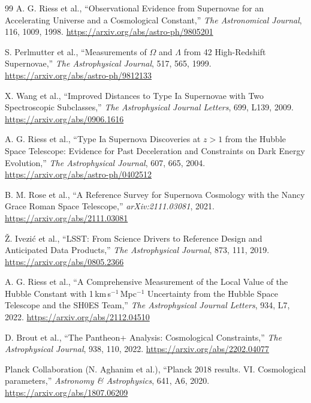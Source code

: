 \begin{thebibliography}{99}
A. G. Riess et al.,
``Observational Evidence from Supernovae for an Accelerating Universe and a Cosmological Constant,''
\emph{The Astronomical Journal}, 116, 1009, 1998.
\url{https://arxiv.org/abs/astro-ph/9805201}

S. Perlmutter et al.,
``Measurements of $\Omega$ and $\Lambda$ from 42 High-Redshift Supernovae,''
\emph{The Astrophysical Journal}, 517, 565, 1999.
\url{https://arxiv.org/abs/astro-ph/9812133}

X. Wang et al.,
``Improved Distances to Type Ia Supernovae with Two Spectroscopic Subclasses,''
\emph{The Astrophysical Journal Letters}, 699, L139, 2009.
\url{https://arxiv.org/abs/0906.1616}

A. G. Riess et al.,
``Type Ia Supernova Discoveries at $z>1$ from the Hubble Space Telescope: Evidence for Past Deceleration and Constraints on Dark Energy Evolution,''
\emph{The Astrophysical Journal}, 607, 665, 2004.
\url{https://arxiv.org/abs/astro-ph/0402512}

B. M. Rose et al.,
``A Reference Survey for Supernova Cosmology with the Nancy Grace Roman Space Telescope,''
\emph{arXiv:2111.03081}, 2021.
\url{https://arxiv.org/abs/2111.03081}

{\v Z}. Ivezi{\'c} et al.,
``LSST: From Science Drivers to Reference Design and Anticipated Data Products,''
\emph{The Astrophysical Journal}, 873, 111, 2019.
\url{https://arxiv.org/abs/0805.2366}

A. G. Riess et al.,
``A Comprehensive Measurement of the Local Value of the Hubble Constant with 1\,km\,s$^{-1}$\,Mpc$^{-1}$ Uncertainty from the Hubble Space Telescope and the SH0ES Team,''
\emph{The Astrophysical Journal Letters}, 934, L7, 2022.
\url{https://arxiv.org/abs/2112.04510}

D. Brout et al.,
``The Pantheon+ Analysis: Cosmological Constraints,''
\emph{The Astrophysical Journal}, 938, 110, 2022.
\url{https://arxiv.org/abs/2202.04077}

Planck Collaboration (N. Aghanim et al.),
``Planck 2018 results. VI. Cosmological parameters,''
\emph{Astronomy \& Astrophysics}, 641, A6, 2020.
\url{https://arxiv.org/abs/1807.06209}


\end{thebibliography}
